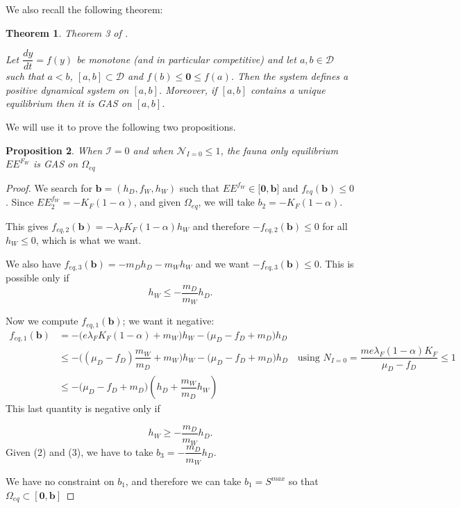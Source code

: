 \documentclass{article}
\newcommand{\lfw}{\lambda_{F}}
\newcommand{\lfw}{\lambda_{F}}
\newcommand{\cI}{\mathcal{I}}
\newcommand{\vb}{\mathbf{b}}
\newtheorem{theorem}{Theorem}
\newtheorem{prop}[theorem]{Proposition}
\theoremstyle{definition}
\theoremstyle{remark}
\begin{document}
We also recall the following theorem:
\begin{theorem} \label{theorem: monotone GAS} Theorem 3 of \cite{anguelov_monotone_2010}.

Let $\dfrac{dy}{dt} = f(y)$ be monotone (and in particular competitive) and let $a,b \in \mathcal{D}$ such that $a <b$, $[a, b] \subset \mathcal{D}$ and $f(b) \leq \mathbf{0} \leq f(a)$. Then the system defines a positive dynamical system on $[a, b] $. Moreover, if $[a, b] $ contains a unique equilibrium then it is GAS on $[a, b] $.
\end{theorem}

We will use it to prove the following two propositions. 

\begin{prop}
When $\cI = 0$ and when $\mathcal{N}_{I=0} \leq 1$, the fauna only equilibrium $EE^{F_W}$ is GAS on $\Omega_{eq}$
\end{prop}


\begin{proof} 
We search for $\mathbf{b} = (h_D, f_W, h_W)$ such that $EE^{f_W} \in \Big[\mathbf{0}, \mathbf{b} \Big]$ and $f_{eq}(\vb) \leq 0$.
Since $EE^{f_W}_2 = -K_F(1-\alpha)$, and given $\Omega_{eq}$, we will take $b_2 = -K_F(1-\alpha)$.

This gives $f_{eq, 2}(\mathbf{b}) = -\lfw K_F(1-\alpha) h_W$ and therefore $-f_{eq, 2}(\mathbf{b}) \leq 0$ for all $h_W \leq 0$, which is what we want.

We also have $f_{eq,3}(\mathbf{b}) = -m_D h_D - m_W h_W$ and we want $-f_{eq,3}(\mathbf{b}) \leq 0$. This is possible only if 
\begin{equation}
h_W \leq -\dfrac{m_D}{m_W}h_D.
\end{equation}

Now we compute $f_{eq,1}(\mathbf{b})$; we want it negative:
\begin{align*}
f_{eq,1}(\mathbf{b}) &= -\Big(e\lfw K_F(1-\alpha) + m_W\Big)h_W - \Big(\mu_D - f_D + m_D\Big) h_D \\
& \leq -\Big((\mu_D - f_D)\dfrac{m_W}{m_D} + m_W\Big)h_W - \Big(\mu_D - f_D + m_D\Big) h_D \quad \text{using $N_{I= 0} = \dfrac{m e \lfw (1-\alpha)K_F}{\mu_D - f_D} \leq 1$} \\
& \leq - \Big(\mu_D - f_D + m_D\Big)( h_D + \dfrac{m_W}{m_D}h_W )
\end{align*}
This last quantity is negative only if 

\begin{equation} h_W \geq - \dfrac{m_D}{m_W}h_D. \end{equation}
Given (2) and (3), we have to take $b_3 = - \dfrac{m_D}{m_W}h_D$. 

We have no constraint on $b_1$, and therefore we can take $b_1 = S^{max}$ so that $\Omega_{eq} \subset [\mathbf{0}, \mathbf{b}]$

\end{proof}
\end{document}
